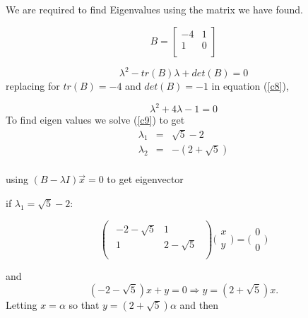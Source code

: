 \documentclass[12pt,a4paper]{article}
\begin{document}
\begin{enumerate}
	 We are required to find Eigenvalues using the matrix we have found.

\begin{equation}
B=
  \left[ {\begin{array}{cc}
   -4 & 1 \\
   1 & 0 \\
  \end{array} } \right]
\end{equation}


\begin{equation}
\lambda^2 - tr(B)\lambda + det(B) =0  \label{c8}
\end{equation}
replacing for $tr(B)=-4$ and $ det(B)=-1$ in equation (\ref{c8}),

\begin{equation}
\lambda^2 + 4\lambda -1 =0  \label{c9}
\end{equation}
To find eigen values we solve (\ref{c9}) to get
\begin{eqnarray*}
\lambda_1 &=& \sqrt{5}-2  \\
\lambda_2 &=& -(2 + \sqrt{5})\\
\end{eqnarray*}

using  $(B- \lambda I)\vec{x} = 0$ to get eigenvector

if $\lambda_1 = \sqrt{5}-2 $:


\begin{equation}
 \begin{pmatrix}{\begin{array}{cc}
   -2-\sqrt{5} & 1 \\
   1 & 2 - \sqrt{5} \\
  \end{array} } \end{pmatrix}\bigg(\begin{smallmatrix} x \\\\y \end{smallmatrix}\bigg)= \bigg(\begin{smallmatrix} 0 \\\\ 0 \end{smallmatrix}\bigg)
\end{equation}

and
\begin{equation*}
( -2-\sqrt{5})x  + y = 0\Rightarrow y=( 2+ \sqrt{5})x.
\end{equation*}
Letting $x =\alpha$  so that $y=( 2+ \sqrt{5})\alpha $ and then


\end{enumerate}
\end{document}
